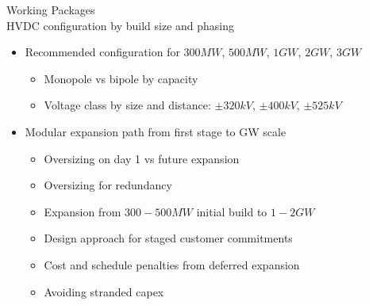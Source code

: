 \begin{frame}{Working Packages\\ HVDC configuration by build size and phasing}
  \begin{itemize}
  \setlength{\itemsep}{0.5em}
  \item Recommended configuration for $300MW$, $500MW$, $1GW$, $2GW$, $3GW$
    \begin{itemize}
      \item Monopole vs bipole by capacity
      \item Voltage class by size and distance: $\pm320kV$, $\pm400kV$, $\pm525kV$

    \end{itemize}
  
    \item Modular expansion path from first stage to GW scale
    \begin{itemize}
      \item Oversizing on day 1 vs future expansion
      \item Oversizing for redundancy
      \item Expansion from $300-500MW$ initial build to $1-2GW$
      \item Design approach for staged customer commitments
      \item Cost and schedule penalties from deferred expansion
      \item Avoiding stranded capex
    \end{itemize}  
\end{itemize}
\end{frame}



